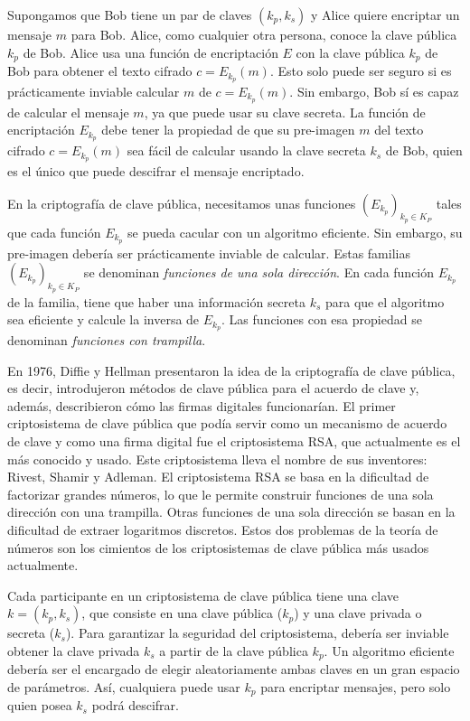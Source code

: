 Supongamos que Bob tiene un par de claves $(k_p, k_s)$ y Alice quiere encriptar un mensaje $m$ para Bob. Alice, como cualquier otra persona, conoce la clave pública $k_p$ de Bob. Alice usa una función de encriptación $E$ con la clave pública $k_p$ de Bob para obtener el texto cifrado $c = E_{k_p}(m)$. Esto solo puede ser seguro si es prácticamente inviable calcular $m$ de $c = E_{k_p}(m)$. Sin embargo, Bob sí es capaz de calcular el mensaje $m$, ya que puede usar su clave secreta. La función de encriptación $E_{k_p}$ debe tener la propiedad de que su pre-imagen $m$ del texto cifrado $c = E_{k_p}(m)$ sea fácil de calcular usando la clave secreta $k_s$ de Bob, quien es el único que puede descifrar el mensaje encriptado.

En la criptografía de clave pública, necesitamos unas funciones $\left( E_{k_p} \right)_{k_p \in K_P}$ tales que cada función $E_{k_p}$ se pueda cacular con un algoritmo eficiente. Sin embargo, su pre-imagen debería ser prácticamente inviable de calcular. Estas familias $\left( E_{k_p} \right)_{k_p \in K_P}$ se denominan \emph{funciones de una sola dirección}. En cada función $E_{k_p}$ de la familia, tiene que haber una información secreta $k_s$ para que el algoritmo sea eficiente y calcule la inversa de $E_{k_p}$. Las funciones con esa propiedad se denominan \emph{funciones con trampilla}.

En 1976, Diffie y Hellman \cite{Diffie_Hellman_1976} presentaron la idea de la criptografía de clave pública, es decir, introdujeron métodos de clave pública para el acuerdo de clave y, además, describieron cómo las firmas digitales funcionarían. El primer criptosistema de clave pública que podía servir como un mecanismo de acuerdo de clave y como una firma digital fue el criptosistema RSA, que actualmente es el más conocido y usado. Este criptosistema lleva el nombre de sus inventores: Rivest, Shamir y Adleman. El criptosistema RSA se basa en la dificultad de factorizar grandes números, lo que le permite construir funciones de una sola dirección con una trampilla. Otras funciones de una sola dirección se basan en la dificultad de extraer logaritmos discretos. Estos dos problemas de la teoría de números son los cimientos de los criptosistemas de clave pública más usados actualmente.

Cada participante en un criptosistema de clave pública tiene una clave $k = (k_p, k_s)$, que consiste en una clave pública ($k_p$) y una clave privada o secreta ($k_s$). Para garantizar la seguridad del criptosistema, debería ser inviable obtener la clave privada $k_s$ a partir de la clave pública $k_p$. Un algoritmo eficiente debería ser el encargado de elegir aleatoriamente ambas claves en un gran espacio de parámetros. Así, cualquiera puede usar $k_p$ para encriptar mensajes, pero solo quien posea $k_s$ podrá descifrar.

